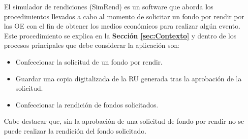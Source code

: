 El simulador de rendiciones (SimRend) es un software que aborda los procedimientos llevados a cabo al momento de solicitar un fondo por rendir por las OE con el fin de obtener los medios económicos para realizar algún evento. Este procedimiento se explica en la \textbf{Sección \ref{sec:Contexto}} y dentro de los procesos principales que debe considerar la aplicación son:

\begin{itemize}
    \item Confeccionar la solicitud de un fondo por rendir.
    \item Guardar una copia digitalizada de la RU generada tras la aprobación de la solicitud.
    \item Confeccionar la rendición de fondos solicitados. 
\end{itemize}

Cabe destacar que, sin la aprobación de una solicitud de fondo por rendir no se puede realizar la rendición del fondo solicitado.

